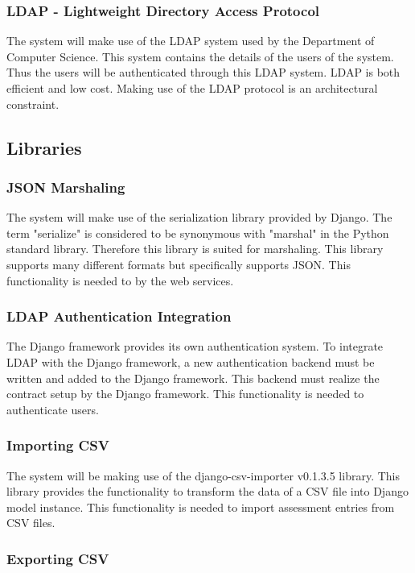 \subsubsection{LDAP - Lightweight Directory Access Protocol}

The system will make use of the LDAP system used by the Department of Computer Science. This system contains the details of the users of the system.
Thus the users will be authenticated through this LDAP system. LDAP is both efficient and low cost. Making use of the LDAP protocol is an architectural constraint. 

\subsection{Libraries}

\subsubsection{JSON Marshaling}

The system will make use of the serialization library provided by Django. The term "serialize" is considered to be synonymous with "marshal" in the Python standard library. Therefore this library is suited for marshaling. This library supports many different formats but specifically supports JSON. This functionality is needed to by the web services.

\subsubsection{LDAP Authentication Integration}

The Django framework provides its own authentication system. To integrate LDAP with the Django framework, 
a new authentication backend must be written and added to the Django framework. This backend must realize the
contract setup by the Django framework. This functionality is needed to authenticate users.

\subsubsection{Importing CSV}

The system will be making use of the django-csv-importer v0.1.3.5 library. This library provides the functionality to transform the data of a CSV file into Django model instance. This functionality is needed to import assessment entries from CSV files.

\subsubsection{Exporting CSV}

